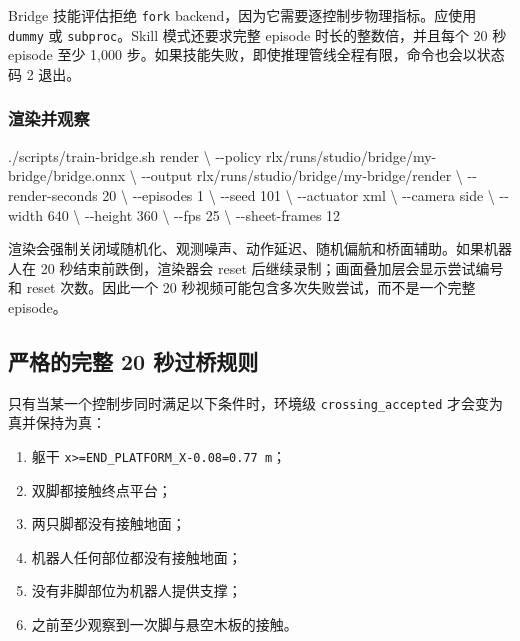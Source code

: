 \documentclass[
  chinese,
  11pt,
  letterpaper,
]{article}
\newenvironment{Shaded}{\begin{snugshade}}{\end{snugshade}}
\newcommand{\AttributeTok}[1]{\textcolor[rgb]{0.13,0.29,0.53}{#1}}
\newcommand{\DataTypeTok}[1]{\textcolor[rgb]{0.13,0.29,0.53}{#1}}
\newcommand{\ExtensionTok}[1]{#1}
\newcommand{\NormalTok}[1]{#1}
\providecommand{\tightlist}{%
  \setlength{\itemsep}{0pt}\setlength{\parskip}{0pt}}
\renewenvironment{Shaded}{\par\smallskip}{\par\smallskip}
\begin{document}
Bridge 技能评估拒绝 \texttt{fork}
backend，因为它需要逐控制步物理指标。应使用 \texttt{dummy} 或
\texttt{subproc}。Skill 模式还要求完整 episode 时长的整数倍，并且每个 20
秒 episode 至少 1,000
步。如果技能失败，即使推理管线全程有限，命令也会以状态码 2 退出。

\subsubsection{渲染并观察}\label{ux6e32ux67d3ux5e76ux89c2ux5bdf}

\begin{Shaded}
\begin{Highlighting}[]
\ExtensionTok{./scripts/train{-}bridge.sh}\NormalTok{ render }\DataTypeTok{\textbackslash{}}
  \AttributeTok{{-}{-}policy}\NormalTok{ rlx/runs/studio/bridge/my{-}bridge/bridge.onnx }\DataTypeTok{\textbackslash{}}
  \AttributeTok{{-}{-}output}\NormalTok{ rlx/runs/studio/bridge/my{-}bridge/render }\DataTypeTok{\textbackslash{}}
  \AttributeTok{{-}{-}render{-}seconds}\NormalTok{ 20 }\DataTypeTok{\textbackslash{}}
  \AttributeTok{{-}{-}episodes}\NormalTok{ 1 }\DataTypeTok{\textbackslash{}}
  \AttributeTok{{-}{-}seed}\NormalTok{ 101 }\DataTypeTok{\textbackslash{}}
  \AttributeTok{{-}{-}actuator}\NormalTok{ xml }\DataTypeTok{\textbackslash{}}
  \AttributeTok{{-}{-}camera}\NormalTok{ side }\DataTypeTok{\textbackslash{}}
  \AttributeTok{{-}{-}width}\NormalTok{ 640 }\DataTypeTok{\textbackslash{}}
  \AttributeTok{{-}{-}height}\NormalTok{ 360 }\DataTypeTok{\textbackslash{}}
  \AttributeTok{{-}{-}fps}\NormalTok{ 25 }\DataTypeTok{\textbackslash{}}
  \AttributeTok{{-}{-}sheet{-}frames}\NormalTok{ 12}
\end{Highlighting}
\end{Shaded}

渲染会强制关闭域随机化、观测噪声、动作延迟、随机偏航和桥面辅助。如果机器人在
20 秒结束前跌倒，渲染器会 reset 后继续录制；画面叠加层会显示尝试编号和
reset 次数。因此一个 20 秒视频可能包含多次失败尝试，而不是一个完整
episode。

\subsection{严格的完整 20
秒过桥规则}\label{ux4e25ux683cux7684ux5b8cux6574-20-ux79d2ux8fc7ux6865ux89c4ux5219}

只有当某一个控制步同时满足以下条件时，环境级
\texttt{crossing\allowbreak{}\_\allowbreak{}accepted\allowbreak{}}
才会变为真并保持为真：

\begin{enumerate}
\def\labelenumi{\arabic{enumi}.}
\tightlist
\item
  躯干 \texttt{x\textgreater{}=END\_PLATFORM\_X-0.08=0.77\ m}；
\item
  双脚都接触终点平台；
\item
  两只脚都没有接触地面；
\item
  机器人任何部位都没有接触地面；
\item
  没有非脚部位为机器人提供支撑；
\item
  之前至少观察到一次脚与悬空木板的接触。
\end{enumerate}
\end{document}
